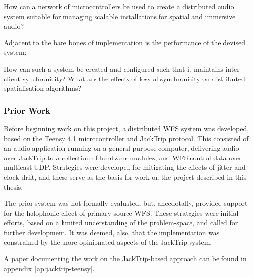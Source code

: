 \begin{researchq}
    \label{rq:rq1}
    How can a network of microcontrollers be used to create a distributed
    audio system suitable for managing scalable installations for spatial
    and immersive audio?
\end{researchq}

\noindent
Adjacent to the bare bones of implementation is the performance of the devised
system:

\begin{researchq}
    \label{rq:rq2}
    How can such a system be created and configured such that it maintains
    inter-client synchronicity? What are the effects of loss of
    synchronicity on distributed spatialisation algorithms?
\end{researchq}


\subsubsection{Prior Work}

Before beginning work on this project, a distributed WFS system was
developed, based on the Teensy 4.1 microcontroller and JackTrip protocol.
This consisted of an audio application running on a general purpose computer,
delivering audio over JackTrip to a collection of hardware modules, and
WFS control data over multicast UDP.
Strategies were developed for mitigating the effects of jitter and clock drift,
and these serve as the basis for work on the project described in this thesis.

The prior system was not formally evaluated, but, anecdotally, provided
support for the holophonic effect of primary-source WFS.
These strategies were initial efforts, based on a limited understanding
of the problem-space, and called for further development.
It was deemed, also, that the implementation was constrained by the more
opinionated aspects of the JackTrip system.

A paper documenting the work on the JackTrip-based approach can be found in
appendix~\ref{ap:jacktrip-teensy}.

